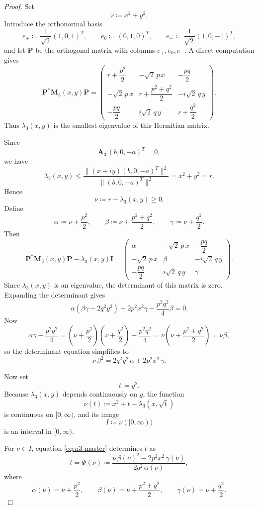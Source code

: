 \documentclass[11pt]{article}
\begin{document}
\begin{proof}
Set
\[
r\coloneqq x^2+y^2.
\]
Introduce the orthonormal basis
\[
e_+\coloneqq \frac1{\sqrt2}(1,0,1)^T,
\qquad
e_0\coloneqq (0,1,0)^T,
\qquad
e_-\coloneqq \frac1{\sqrt2}(1,0,-1)^T,
\]
and let \(\mathbf P\) be the orthogonal matrix with columns \(e_+,e_0,e_-\). A direct computation gives
\[
\mathbf P^* \mathbf M_3(x,y)\mathbf P=
\begin{pmatrix}
r+\dfrac{p^2}{2} & -\sqrt2\,p\,x & -\dfrac{pq}{2}\\[1ex]
-\sqrt2\,p\,x & r+\dfrac{p^2+q^2}{2} & -i\sqrt2\,q\,y\\[1ex]
-\dfrac{pq}{2} & i\sqrt2\,q\,y & r+\dfrac{q^2}{2}
\end{pmatrix}.
\]
Thus \(\lambda_3(x,y)\) is the smallest eigenvalue of this Hermitian matrix.

Since
\[
\mathbf A_3\,(b,0,-a)^T=0,
\]
we have
\[
\lambda_3(x,y)\le
\frac{\|(x+iy)(b,0,-a)^T\|^2}{\|(b,0,-a)^T\|^2}
=
x^2+y^2=r.
\]
Hence
\[
\nu\coloneqq r-\lambda_3(x,y)\ge 0.
\]
Define
\[
\alpha\coloneqq \nu+\frac{p^2}{2},
\qquad
\beta\coloneqq \nu+\frac{p^2+q^2}{2},
\qquad
\gamma\coloneqq \nu+\frac{q^2}{2}.
\]
Then
\[
\mathbf P^* \mathbf M_3(x,y)\mathbf P-\lambda_3(x,y)\mathbf I
=
\begin{pmatrix}
\alpha & -\sqrt2\,p\,x & -\dfrac{pq}{2}\\[1ex]
-\sqrt2\,p\,x & \beta & -i\sqrt2\,q\,y\\[1ex]
-\dfrac{pq}{2} & i\sqrt2\,q\,y & \gamma
\end{pmatrix}.
\]
Since \(\lambda_3(x,y)\) is an eigenvalue, the determinant of this matrix is zero. Expanding
the determinant gives
\[
\alpha(\beta\gamma-2q^2y^2)-2p^2x^2\gamma-\frac{p^2q^2}{4}\beta=0.
\]
Now
\[
\alpha\gamma-\frac{p^2q^2}{4}
=
\left(\nu+\frac{p^2}{2}\right)\left(\nu+\frac{q^2}{2}\right)-\frac{p^2q^2}{4}
=
\nu\left(\nu+\frac{p^2+q^2}{2}\right)
=
\nu\beta,
\]
so the determinant equation simplifies to
\begin{equation}\label{eq:n3-master}
\nu\,\beta^2=2q^2y^2\,\alpha+2p^2x^2\,\gamma.
\end{equation}

Now set
\[
t\coloneqq y^2.
\]
Because \(\lambda_3(x,y)\) depends continuously on \(y\), the function
\[
\nu(t)\coloneqq x^2+t-\lambda_3(x,\sqrt t)
\]
is continuous on \([0,\infty)\), and its image
\[
I\coloneqq \nu([0,\infty))
\]
is an interval in \([0,\infty)\).

For \(\nu\in I\), equation \eqref{eq:n3-master} determines \(t\) as
\[
t=\Phi(\nu)\coloneqq
\frac{\nu\,\beta(\nu)^2-2p^2x^2\,\gamma(\nu)}{2q^2\,\alpha(\nu)},
\]
where
\[
\alpha(\nu)=\nu+\frac{p^2}{2},
\qquad
\beta(\nu)=\nu+\frac{p^2+q^2}{2},
\qquad
\gamma(\nu)=\nu+\frac{q^2}{2}.
\]


\end{proof}
\end{document}
